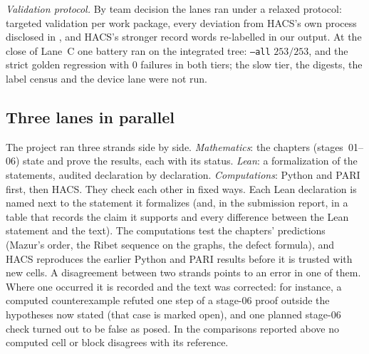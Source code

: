 \emph{Validation protocol.} By team decision the lanes ran under a relaxed protocol: targeted validation per work package, every
deviation from HACS's own process disclosed in , and HACS's stronger record words re-labelled in our
output. At the close of Lane~C one battery ran on the integrated tree: \texttt{--all} $253/253$, and the strict golden
regression with $0$ failures in both tiers; the slow tier, the digests, the label census and the device lane were not run.

\subsection*{Three lanes in parallel}
The project ran three strands side by side. \emph{Mathematics}: the chapters (stages~01--06) state and prove the results, each with
its status. \emph{Lean}: a formalization of the statements, audited declaration by declaration. \emph{Computations}: Python and PARI
first, then HACS. They check each other in fixed ways. Each Lean declaration is named next to the statement it formalizes (and,
in the submission report, in a table that records the claim it supports and every difference between the Lean statement and the
text). The computations test the chapters' predictions (Mazur's order, the Ribet sequence on the graphs, the defect formula), and
HACS reproduces the earlier Python and PARI results before it is trusted with new cells. A disagreement between two strands points to an error in one of them. Where one occurred it is recorded and the text was
corrected: for instance, a computed counterexample refuted one step of a stage-06 proof outside the hypotheses now stated
(that case is marked open), and one planned stage-06 check turned out to be false as posed. In the comparisons reported
above no computed cell or block disagrees with its reference.

